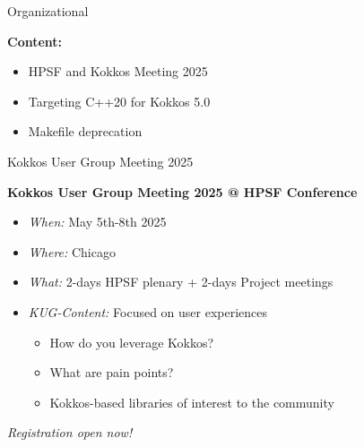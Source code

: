 

\begin{frame}[fragile]

  {\Huge Organizational}

  \vspace{10pt}

  \textbf{Content:}
  \begin{itemize}
    \item HPSF and Kokkos Meeting 2025
    \item Targeting C++20 for Kokkos 5.0
    \item Makefile deprecation
  \end{itemize}

\end{frame}


\begin{frame}[fragile]{Kokkos User Group Meeting 2025}
\begin{center}
\textbf{Kokkos User Group Meeting 2025 @ HPSF Conference}
\end{center}

\begin{itemize}
\item{\textit{When:} May 5th-8th 2025}
\item{\textit{Where:} Chicago}
\item{\textit{What:} 2-days HPSF plenary + 2-days Project meetings}
\item{\textit{KUG-Content:} Focused on user experiences
\begin{itemize}
   \item{How do you leverage Kokkos?}
   \item{What are pain points?}
   \item{Kokkos-based libraries of interest to the community}
\end{itemize}
}
\end{itemize}

\vspace{10pt}

\begin{center}
\textit{Registration open now!}
\end{center}
\end{frame}

